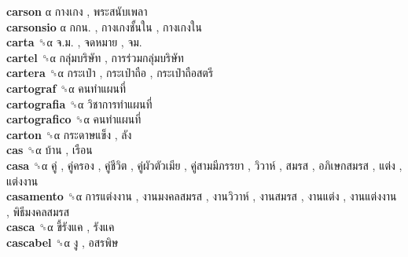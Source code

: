 \textbf{carson} α   กางเกง ,  พระสนับเพลา   \\
\textbf{carsonsio} α   กกน. ,  กางเกงชั้นใน ,  กางเกงใน   \\
\textbf{carta} ␝α   จ.ม. ,  จดหมาย ,  จม.   \\
\textbf{cartel} ␝α   กลุ่มบริษัท ,  การร่วมกลุ่มบริษัท   \\
\textbf{cartera} ␝α   กระเป๋า ,  กระเป๋าถือ ,  กระเป๋าถือสตรี   \\
\textbf{cartograf} ␝α   คนทำแผนที่   \\
\textbf{cartografia} ␝α   วิชาการทำแผนที่   \\
\textbf{cartografico} ␝α   คนทำแผนที่   \\
\textbf{carton} ␝α   กระดาษแข็ง ,  ลัง   \\
\textbf{cas} ␝α   บ้าน ,  เรือน   \\
\textbf{casa} ␝α   คู่ ,  คู่ครอง ,  คู่ชีวิต ,  คู่ผัวตัวเมีย ,  คู่สามมีภรรยา ,  วิวาห์ ,  สมรส ,  อภิเษกสมรส ,  แต่ง ,  แต่งงาน   \\
\textbf{casamento} ␝α   การแต่งงาน ,  งานมงคลสมรส ,  งานวิวาห์ ,  งานสมรส ,  งานแต่ง ,  งานแต่งงาน ,  พิธีมงคลสมรส   \\
\textbf{casca} ␝α   ขี้รังแค ,  รังแค   \\
\textbf{cascabel} ␝α   งู ,  อสรพิษ   \\
